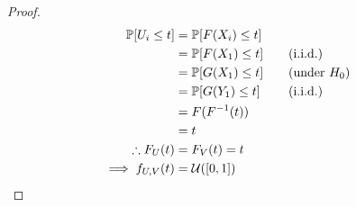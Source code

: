 \documentclass[letterpaper, oneside, reqno]{amsart}
\renewcommand{\(}{\mleft(}
\renewcommand{\)}{\mright)}
\renewcommand{\[}{\mleft[}
\renewcommand{\]}{\mright]}
\newcommand{\Prob}[1]{\mathbb{P}\[#1\]}
\newcommand{\U}[2]{\mathcal{U}\(\[ #1, #2 \]\)}
\newcommand{\iid}{i.i.d.\ }
\newcommand{\by}[1]{&\quad&\text{(#1)}}
\begin{document}
\begin{proof}
  \begin{alignat*}{3}
    \Prob{U_i \le t} &= \Prob{F(X_i) \le t} \\
                     &= \Prob{F(X_1) \le t} \by{\iid\!\!} \\
                     &= \Prob{G(X_1) \le t} \by{under $H_0$} \\
                     &= \Prob{G(Y_1) \le t} \by{\iid\!\!} \\
                     &= F(F^{-1}(t)) \\
                     &= t \\
    \therefore F_U(t) &= F_V(t) = t \\
    \implies f_{U,V}(t) &= \U{0}{1} \qedhere
  \end{alignat*}
\end{proof}

% 

% 
% 

%
%
% 
%
\end{document}
